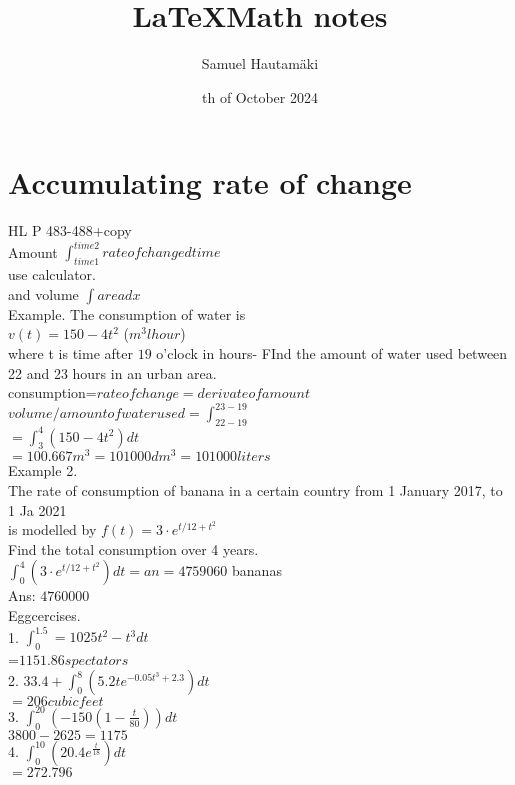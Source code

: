 \documentclass{article}
\title{\LaTeX Math notes}
\author{Samuel Hautamäki}
\date{th of October 2024}
\begin{document}
  \maketitle
   
  \section{Accumulating rate of change}
  HL P 483-488+copy\\
  Amount $\int_{time 1}^{time 2}rate of change dtime$\\
  use calculator.\\
  and volume $\int area dx$\\
  Example. The consumption of water is\\
  $v(t)=150-4t^2$ ($m^3 l hour$)\\
  where t is time after $19$ o'clock in hours- FInd the amount of water used between 22 and 23 hours in an urban area.\\
  consumption=$rate of change=derivate of amount$\\
  $volume/amount of water used=\int_{22-19}^{23-19}$\\
  $=\int_{3}^{4}(150-4t^2)dt$\\
  $=100.667m^3=101000 dm^3=101 000 liters$\\
  Example 2.\\
  The rate of consumption of banana in a certain country from 1 January 2017, to 1 Ja 2021\\
  is modelled by $f(t)=3\cdot e^{t/12+t^2}$\\
  Find the total consumption over 4 years.\\
  $\int_{0}^{4}(3\cdot e^{t/12+t^2})dt=an=4 759 060$ bananas\\
  Ans: $4 760 000$\\
  Eggcercises.\\
  1. $\int_{0}^{1.5}=1025t^2-t^3 dt$\\
  =$1151.86spectators$\\
  2. $33.4+\int_{0}^{8}(5.2te^{-0.05t^3+2.3})dt$\\
  $=206cubicfeet$\\
  3. $\int_{0}^{20}(-150(1-\frac{t}{80}))dt$\\
  $3800-2625=1175$\\
  4. $\int_{0}^{10}(20.4e^{\frac{t}{18}})dt$\\
  $=272.796$\\

   
\end{document}
